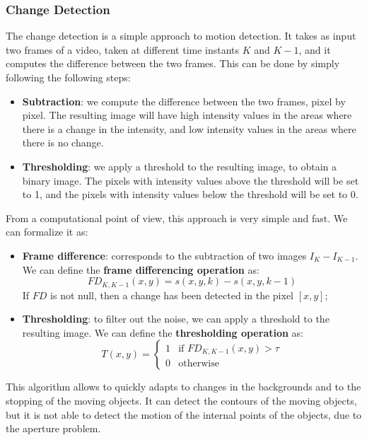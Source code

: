 \subsubsection{Change Detection}
The change detection is a simple approach to motion detection. It takes as input two frames of a video, taken at different time instants $K$ and $K-1$, 
and it computes the difference between the two frames. This can be done by simply following the following steps:
\begin{itemize}
    \item \textbf{Subtraction}: we compute the difference between the two frames, pixel by pixel.
    The resulting image will have high intensity values in the areas where there is a change in the intensity, and low intensity values in the areas where there is no change.
    \item \textbf{Thresholding}: we apply a threshold to the resulting image, to obtain a binary image. The pixels with intensity values above the threshold
    will be set to 1, and the pixels with intensity values below the threshold will be set to 0.
\end{itemize}
From a computational point of view, this approach is very simple and fast. We can formalize it as:
\begin{itemize}
    \item \textbf{Frame difference}: corresponds to the subtraction of two images $I_K - I_{K-1}$.
    We can define the \textbf{frame differencing operation} as:
    \begin{equation}
    \label{eq:frame_difference}
        FD_{K, K-1}(x, y) = s(x, y, k) - s(x, y, k-1)
    \end{equation}
    If $FD$ is not null, then a change has been detected in the pixel $[x, y]$;
    \item \textbf{Thresholding}: to filter out the noise, we can apply a threshold to the resulting image. We can define the \textbf{thresholding operation} as:
    \begin{equation}    
        \label{eq:thresholding}
        T(x, y) = \begin{cases}
            1 & \text{if } FD_{K, K-1}(x, y) > \tau \\
            0 & \text{otherwise}
        \end{cases}
    \end{equation}
\end{itemize}
This algorithm allows to quickly adapts to changes in the backgrounds and to the stopping of the moving objects.
It can detect the contours of the moving objects, but it is not able to detect the motion of the internal points of the objects, due to the aperture problem.

